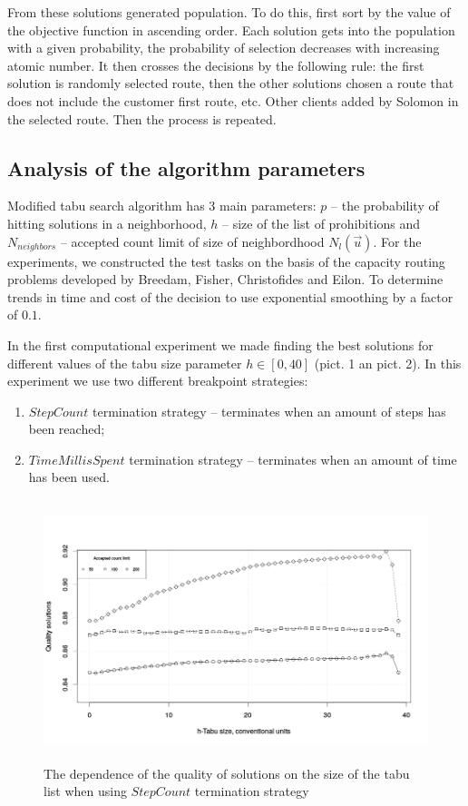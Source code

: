 \documentclass[]{TAACpaper}
\begin{document}
From these solutions generated population. To do this, first sort by the value of the objective function in ascending order. Each solution gets into the population with a given probability, the probability of selection decreases with increasing atomic number. It then crosses the decisions by the following rule: the first solution is randomly selected route, then the other solutions chosen a route that does not include the customer first route, etc. Other clients added by Solomon in the selected route. Then the process is repeated.

\subsection{Analysis of the algorithm parameters}
Modified tabu search algorithm has 3 main parameters: $p$ -- the probability of hitting solutions in a neighborhood, $h$ -- size of the list of prohibitions and $N_{neighbors}$ -- accepted count limit of size of neighbordhood $N_l(\vec{u})$. For the experiments, we constructed the test tasks on the basis of the capacity routing problems developed by Breedam, Fisher, Christofides and Eilon. To determine trends in time and cost of the decision to use exponential smoothing by a factor of $0.1$.

In the first computational experiment we made finding the best solutions for different values of the tabu size parameter $h \in [0, 40]$ (pict. 1 an pict. 2). In this experiment we use two different breakpoint strategies: 
\begin{enumerate}
	\item $StepCount$ termination strategy --  terminates when an amount of steps has been reached;
	\item $TimeMillisSpent$ termination strategy -- terminates when an amount of time has been used.
\end{enumerate}

\begin{figure}[h]
	\hfil\includegraphics[height=3.0in]{images/tabuSize_stepCount}\hfil
	\caption
	{
	  The dependence of the quality of solutions on the size of the tabu list when using $ StepCount $ termination strategy
	}
	\label{aba:fig1}
\end{figure}
\end{document}
